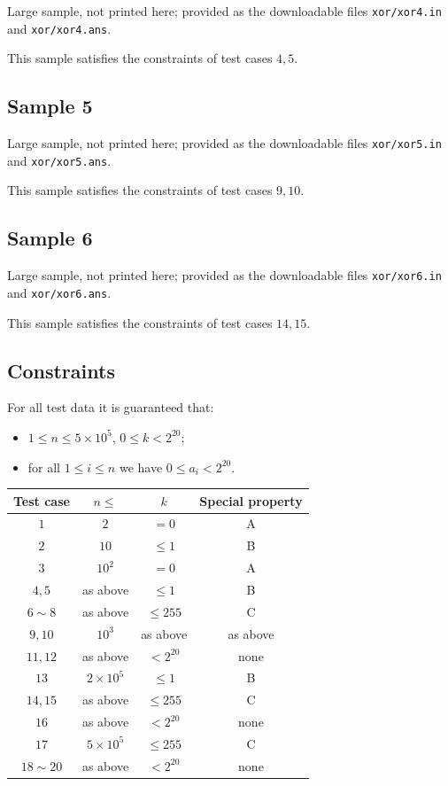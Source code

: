\documentclass[11pt]{article}
\begin{document}
Large sample, not printed here;
provided as the downloadable files \texttt{xor/xor4.in} and \texttt{xor/xor4.ans}.

This sample satisfies the constraints of test cases $4, 5$.

\subsection*{Sample 5}

Large sample, not printed here;
provided as the downloadable files \texttt{xor/xor5.in} and \texttt{xor/xor5.ans}.

This sample satisfies the constraints of test cases $9, 10$.

\subsection*{Sample 6}

Large sample, not printed here;
provided as the downloadable files \texttt{xor/xor6.in} and \texttt{xor/xor6.ans}.

This sample satisfies the constraints of test cases $14, 15$.

\subsection*{Constraints}

For all test data it is guaranteed that:
\begin{itemize}
\item $1 \leq n \leq 5 \times 10^5$, $0 \leq k < 2^{20}$;
\item for all $1 \leq i \leq n$ we have $0 \leq a_i < 2^{20}$.
\end{itemize}

\begin{center}
\begin{tabular}{cccc}
\toprule
Test case & $n \leq$ & $k$ & Special property \\
\midrule
$1$ & $2$ & $= 0$ & A \\
$2$ & $10$ & $\leq 1$ & B \\
$3$ & $10^2$ & $= 0$ & A \\
$4, 5$ & as above & $\leq 1$ & B \\
$6 \sim 8$ & as above & $\leq 255$ & C \\
$9, 10$ & $10^3$ & as above & as above \\
$11, 12$ & as above & $< 2^{20}$ & none \\
$13$ & $2 \times 10^5$ & $\leq 1$ & B \\
$14, 15$ & as above & $\leq 255$ & C \\
$16$ & as above & $< 2^{20}$ & none \\
$17$ & $5 \times 10^5$ & $\leq 255$ & C \\
$18 \sim 20$ & as above & $< 2^{20}$ & none \\
\bottomrule
\end{tabular}
\end{center}
\end{document}
